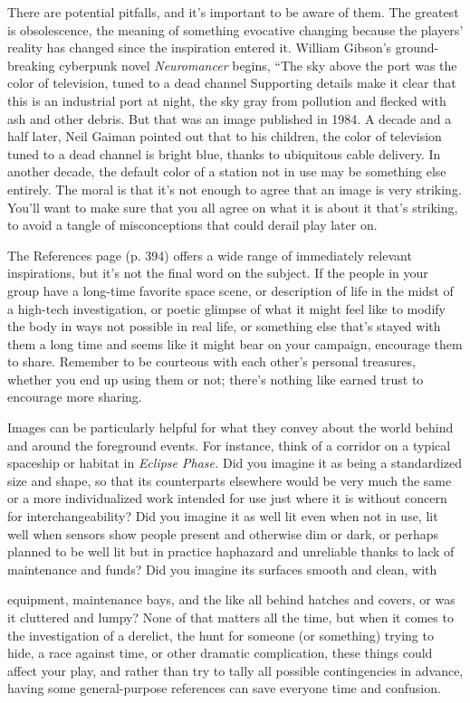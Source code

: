 There are potential pitfalls, and it's important to be aware of them. The greatest is obsolescence, the meaning of something evocative changing because the players' reality has changed since the inspiration entered it. William Gibson's ground-breaking cyberpunk novel \textit{Neuromancer }begins, ``The sky above the port was the color of television, tuned to a dead channel Supporting details make it clear that this is an industrial port at night, the sky gray from pollution and flecked with ash and other debris. But that was an image published in 1984. A decade and a half later, Neil Gaiman pointed out that to his children, the color of television tuned to a dead channel is bright blue, thanks to ubiquitous cable delivery. In another decade, the default color of a station not in use may be something else entirely. The moral is that it's not enough to agree that an image is very striking. You'll want to make sure that you all agree on what it is about it that's striking, to avoid a tangle of misconceptions that could derail play later on. 

The References page (p. 394) offers a wide range of immediately relevant inspirations, but it's not the final word on the subject. If the people in your group have a long-time favorite space scene, or description of life in the midst of a high-tech investigation, or poetic glimpse of what it might feel like to modify the body in ways not possible in real life, or something else that's stayed with them a long time and seems like it might bear on your campaign, encourage them to share. Remember to be courteous with each other's personal treasures, whether you end up using them or not; there's nothing like earned trust to encourage more sharing. 

Images can be particularly helpful for what they convey about the world behind and around the foreground events. For instance, think of a corridor on a typical spaceship or habitat in \textit{Eclipse Phase. } Did you imagine it as being a standardized size and shape, so that its counterparts elsewhere would be very much the same or a more individualized work intended for use just where it is without concern for interchangeability? Did you imagine it as well lit even when not in use, lit well when sensors show people present and otherwise dim or dark, or perhaps planned to be well lit but in practice haphazard and unreliable thanks to lack of maintenance and funds? Did you imagine its surfaces smooth and clean, with 

equipment, maintenance bays, and the like all behind hatches and covers, or was it cluttered and lumpy? None of that matters all the time, but when it comes to the investigation of a derelict, the hunt for someone (or something) trying to hide, a race against time, or other dramatic complication, these things could affect your play, and rather than try to tally all possible contingencies in advance, having some general-purpose references can save everyone time and confusion. 

